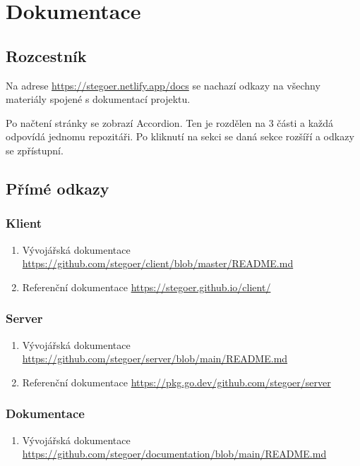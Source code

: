 
\section{Dokumentace}\label{sec:dokumentace}

\subsection{Rozcestník}\label{subsec:rozcestnik}
Na adrese \url{https://stegoer.netlify.app/docs} se nachazí odkazy na všechny
materiály spojené s dokumentací projektu.

Po načtení stránky se zobrazí Accordion\cite{enwiki:accordion}.
Ten je rozdělen na 3 části a každá odpovídá jednomu repozitáři.
Po kliknutí na sekci se daná sekce rozšíří a odkazy se zpřístupní.

\subsection{Přímé odkazy}\label{subsec:online}

\subsubsection{Klient}\label{subsubsec:doc-klient}

\begin{enumerate}
    \item Vývojářská dokumentace \url{https://github.com/stegoer/client/blob/master/README.md}
    \item Referenční dokumentace \url{https://stegoer.github.io/client/}
\end{enumerate}

\subsubsection{Server}\label{subsubsec:doc-server}
\begin{enumerate}
    \item Vývojářská dokumentace \url{https://github.com/stegoer/server/blob/main/README.md}
    \item Referenční dokumentace \url{https://pkg.go.dev/github.com/stegoer/server}
\end{enumerate}

\subsubsection{Dokumentace}\label{subsubsec:doc-dokumentace}
\begin{enumerate}
    \item Vývojářská dokumentace \url{https://github.com/stegoer/documentation/blob/main/README.md}
\end{enumerate}

